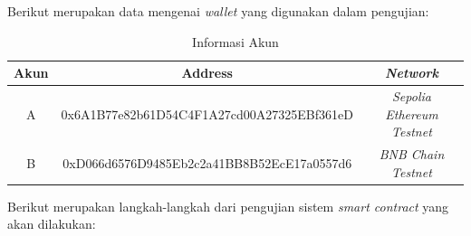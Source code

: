 Berikut merupakan data mengenai \emph{wallet} yang digunakan dalam pengujian:

\begin{center}
\begin{table}[H]
      \centering
      \caption{Informasi Akun}
      \begin{tabular}{|c|c|c|}
      \hline
      \textbf{Akun} & \textbf{Address} & \textbf{\emph{Network}}
      \\
      \hline
      A & 0x6A1B77e82b61D54C4F1A27cd00A27325EBf361eD & \emph{Sepolia Ethereum Testnet}
      \\ 
      \hline
      B & 0xD066d6576D9485Eb2c2a41BB8B52EcE17a0557d6 & \emph{BNB Chain Testnet} \\
      \hline
      \end{tabular}      
      \label{tab:hardware-specs}
\end{table}
\end{center}

Berikut merupakan langkah-langkah dari pengujian sistem \emph{smart contract} yang akan dilakukan:

